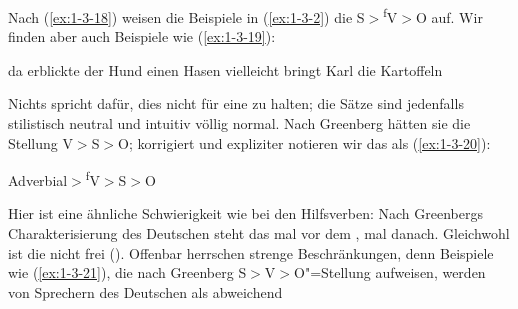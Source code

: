 \documentclass[output=paper]{langsci/langscibook}
\begin{document}
\label{subsec:1-3.2}

\ssubsubsection{}%
\label{subsubsec:1-3.2.1}

Nach (\ref{ex:1-3-18}) weisen die Beispiele in (\ref{ex:1-3-2}) die  S$>$\textsuperscript{f}V$>$O auf. Wir finden
aber auch Beispiele wie (\ref{ex:1-3-19}):
\begin{exe}
\ex\label{ex:1-3-19}
\begin{xlist}
\ex\label{ex:1-3-19a} da erblickte der Hund einen Hasen
\ex\label{ex:1-3-19b} vielleicht bringt Karl die Kartoffeln
\end{xlist}
\end{exe}
Nichts spricht dafür, dies nicht für eine  zu halten; die Sätze
sind jedenfalls stilistisch neutral und intuitiv völlig normal. Nach Greenberg hätten
sie die Stellung V$>$S$>$O; korrigiert und expliziter notieren wir das als (\ref{ex:1-3-20}):
\begin{exe}
\ex\label{ex:1-3-20}
Adverbial$>$\textsuperscript{f}V$>$S$>$O
\end{exe}
Hier ist eine ähnliche Schwierigkeit wie bei den Hilfsverben: Nach
Greenbergs Charakterisierung des Deutschen steht das  mal vor
dem , mal danach. Gleichwohl ist die  nicht frei
(). Offenbar herrschen strenge Beschränkungen, denn
Beispiele wie (\ref{ex:1-3-21}), die nach Greenberg S$>$V$>$O"=Stellung
aufweisen, werden von Sprechern des Deutschen als abweichend
\end{document}
